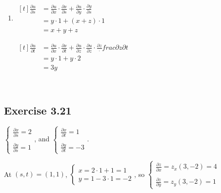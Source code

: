 \begin{enumerate}
    \item $\begin{aligned}[t]
        \frac{\partial u}{\partial s} 
         & = \frac{\partial u}{\partial x} \cdot \frac{\partial x}{\partial s} + \frac{\partial u}{\partial y} \cdot \frac{\partial y}{\partial s} \\
         & = y \cdot 1 + (x + z) \cdot 1 \\
         & = x + y + z
    \end{aligned}$
    \qquad\qquad
    \begin{minipage}[t]{0.45\linewidth}
        $\begin{aligned}[t]
            \frac{\partial u}{\partial t} 
             & = \frac{\partial u}{\partial x} \cdot \frac{\partial x}{\partial t} + \frac{\partial u}{\partial z} \cdot \frac{\partial u}{\partial z} \cdot \frac{\partial z} \cdot frac{\partial z}{\partial t} \\
             & = y \cdot 1 + y \cdot 2 \\
             & = 3y
        \end{aligned}$
    \end{minipage}
\end{enumerate}

{~~~}

\subsection*{Exercise 3.21}

$\begin{cases}
    \frac{\partial x}{\partial s} = 2 \\ \\
    \frac{\partial y}{\partial s} = 1
\end{cases}$, and $\begin{cases}
    \frac{\partial x}{\partial t} = 1 \\ \\
    \frac{\partial y}{\partial t} = -3
\end{cases}$. 

At $(s, t) = (1, 1)$, $\begin{cases} x = 2 \cdot 1 + 1 = 1 \\ y = 1 - 3 \cdot 1 = -2 \end{cases}$, so $\begin{cases}
    \frac{\partial z}{\partial x} = z_x(3, -2) = 4 \\ \\ 
    \frac{\partial z}{\partial y} = z_y(3, -2) = 1 
\end{cases}$


